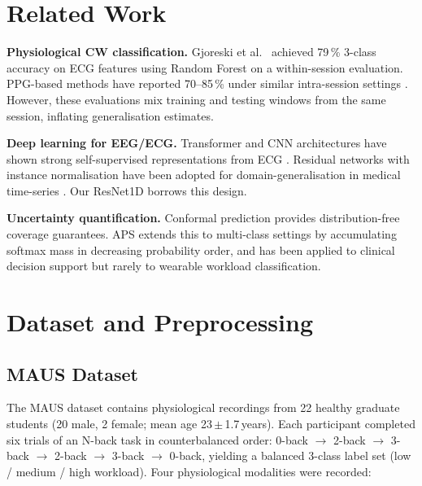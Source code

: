 \documentclass[conference]{IEEEtran}
\begin{document}
\section{Related Work}
\label{sec:related}

\noindent\textbf{Physiological CW classification.} Gjoreski et al.~\cite{gjoreski2017monitoring} achieved 79\,\% 3-class accuracy on ECG features using Random Forest on a within-session evaluation. PPG-based methods have reported 70--85\,\% under similar intra-session settings \cite{studer2019classifying}. However, these evaluations mix training and testing windows from the same session, inflating generalisation estimates.

\noindent\textbf{Deep learning for EEG/ECG.} Transformer and CNN architectures have shown strong self-supervised representations from ECG \cite{sarkar2020self}. Residual networks with instance normalisation have been adopted for domain-generalisation in medical time-series \cite{hoarfrost2022}. Our ResNet1D borrows this design.

\noindent\textbf{Uncertainty quantification.} Conformal prediction \cite{vovk2005algorithmic,angelopoulos2021gentle} provides distribution-free coverage guarantees. APS \cite{romano2020classification} extends this to multi-class settings by accumulating softmax mass in decreasing probability order, and has been applied to clinical decision support \cite{lu2022fair} but rarely to wearable workload classification.

\section{Dataset and Preprocessing}
\label{sec:dataset}

\subsection{MAUS Dataset}

The MAUS dataset \cite{maus2022} contains physiological recordings from 22 healthy graduate students (20 male, 2 female; mean age 23\,$\pm$\,1.7\,years). Each participant completed six trials of an N-back task in counterbalanced order: 0-back $\rightarrow$ 2-back $\rightarrow$ 3-back $\rightarrow$ 2-back $\rightarrow$ 3-back $\rightarrow$ 0-back, yielding a balanced 3-class label set (low / medium / high workload). Four physiological modalities were recorded:
\end{document}
